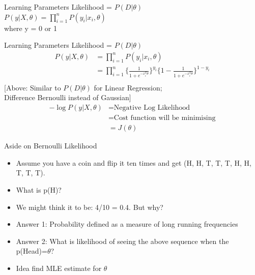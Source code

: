 \documentclass{beamer}
\begin{document}
\begin{frame}{Learning Parameters}
Likelihood = $P(D | \theta)$ \\
\vspace{0.2cm}
$P(y | X, \theta) = \prod_{i=1}^{n} P(y_{i} | x_{i}, \theta)$ \\ where y = 0 or 1
\end{frame}
\begin{frame}{Learning Parameters}
Likelihood = $P(D | \theta)$ \\
\vspace{-0.4cm}
\begin{align*}
P(y | X, \theta) &= \prod_{i=1}^{n} P(y_{i} | x_{i}, \theta) \\ &= \prod_{i=1}^{n} \Big\{\frac{1}{1 + e^{-x_{i}^{T}\theta}}\Big\}^{y_{i}}\Big\{1 - \frac{1}{1 + e^{-x_{i}^{T}\theta}}\Big\}^{1 - y_{i}} \\
\end{align*}
\vspace{0.2cm}
[Above: Similar to $P(D|\theta)$ for Linear Regression; \\
\hspace{1.3cm} Difference Bernoulli instead of Gaussian]\\
\begin{align*}
-\log P(y | X, \theta) &= \text{Negative Log Likelihood}\\ &= \text{Cost function will be minimising} \\ &= J(\theta)
\end{align*}
\end{frame}



\begin{frame}{Aside on Bernoulli Likelihood}
\begin{itemize}[<+->]
\item Assume you have a coin and flip it ten times and get (H, H, T, T, T, H, H, T, T, T).
\item What is p(H)?
\item We might think it to be: 4/10 = 0.4. But why?
\item Answer 1: Probability defined as a measure of long running frequencies
\item Answer 2: What is likelihood of seeing the above sequence when the p(Head)=$\theta$?
\item Idea find MLE estimate for $\theta$
\end{itemize}

\end{frame}
\end{document}
